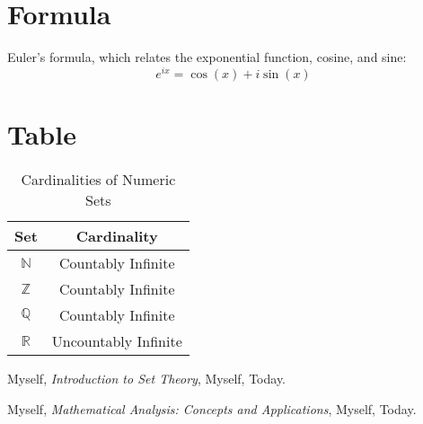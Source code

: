 \documentclass{article}
\begin{document}
\section{Formula}
Euler's formula, which relates the exponential function, cosine, and sine:
\begin{equation}
e^{ix} = \cos(x) + i\sin(x)
\end{equation}

\section{Table}
\begin{table}[h]
  \centering
  \begin{tabular}{|c|c|}
    \hline
    Set & Cardinality \\
    \hline
    \(\mathbb{N}\) & Countably Infinite \\
    \(\mathbb{Z}\) & Countably Infinite \\
    \(\mathbb{Q}\) & Countably Infinite \\
    \(\mathbb{R}\) & Uncountably Infinite \\
    \hline
  \end{tabular}
  \caption{Cardinalities of Numeric Sets}
\end{table}

\newpage

\begin{thebibliography}{9}
  Myself,
  \textit{Introduction to Set Theory},
  Myself, Today.

  Myself,
  \textit{Mathematical Analysis: Concepts and Applications},
  Myself, Today.
\end{thebibliography}
\end{document}

